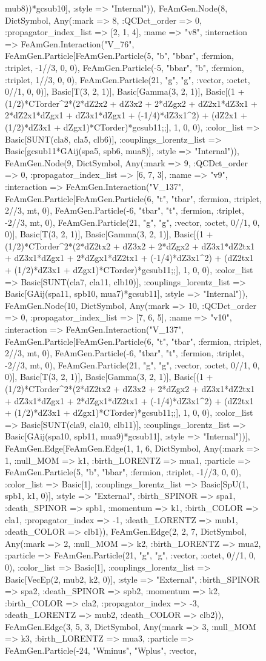\documentclass{revtex4}
\begin{document}
\begin{figure}[!htb]
\begin{center}
{mub8))*gcsub10], :style => "Internal")), FeAmGen.Node(8, Dict{Symbol, Any}(:mark => 8, :QCDct_order => 0, :propagator_index_list => [2, 1, 4], :name => "v8", :interaction => FeAmGen.Interaction("V_76", FeAmGen.Particle[FeAmGen.Particle(5, "b", "bbar", :fermion, :triplet, -1//3, 0, 0), FeAmGen.Particle(-5, "bbar", "b", :fermion, :triplet, 1//3, 0, 0), FeAmGen.Particle(21, "g", "g", :vector, :octet, 0//1, 0, 0)], Basic[T(3, 2, 1)], Basic[Gamma(3, 2, 1)], Basic[(1 + (1/2)*CTorder^2*(2*dZ2x2 + dZ3x2 + 2*dZgx2 + dZ2x1*dZ3x1 + 2*dZ2x1*dZgx1 + dZ3x1*dZgx1 + (-1/4)*dZ3x1^2) + (dZ2x1 + (1/2)*dZ3x1 + dZgx1)*CTorder)*gcsub11;;], 1, 0, 0), :color_list => Basic[SUNT(cla8, cla5, clb6)], :couplings_lorentz_list => Basic[gcsub11*GAij(spa5, spb6, mua8)], :style => "Internal")), FeAmGen.Node(9, Dict{Symbol, Any}(:mark => 9, :QCDct_order => 0, :propagator_index_list => [6, 7, 3], :name => "v9", :interaction => FeAmGen.Interaction("V_137", FeAmGen.Particle[FeAmGen.Particle(6, "t", "tbar", :fermion, :triplet, 2//3, mt, 0), FeAmGen.Particle(-6, "tbar", "t", :fermion, :triplet, -2//3, mt, 0), FeAmGen.Particle(21, "g", "g", :vector, :octet, 0//1, 0, 0)], Basic[T(3, 2, 1)], Basic[Gamma(3, 2, 1)], Basic[(1 + (1/2)*CTorder^2*(2*dZ2tx2 + dZ3x2 + 2*dZgx2 + dZ3x1*dZ2tx1 + dZ3x1*dZgx1 + 2*dZgx1*dZ2tx1 + (-1/4)*dZ3x1^2) + (dZ2tx1 + (1/2)*dZ3x1 + dZgx1)*CTorder)*gcsub11;;], 1, 0, 0), :color_list => Basic[SUNT(cla7, cla11, clb10)], :couplings_lorentz_list => Basic[GAij(spa11, spb10, mua7)*gcsub11], :style => "Internal")), FeAmGen.Node(10, Dict{Symbol, Any}(:mark => 10, :QCDct_order => 0, :propagator_index_list => [7, 6, 5], :name => "v10", :interaction => FeAmGen.Interaction("V_137", FeAmGen.Particle[FeAmGen.Particle(6, "t", "tbar", :fermion, :triplet, 2//3, mt, 0), FeAmGen.Particle(-6, "tbar", "t", :fermion, :triplet, -2//3, mt, 0), FeAmGen.Particle(21, "g", "g", :vector, :octet, 0//1, 0, 0)], Basic[T(3, 2, 1)], Basic[Gamma(3, 2, 1)], Basic[(1 + (1/2)*CTorder^2*(2*dZ2tx2 + dZ3x2 + 2*dZgx2 + dZ3x1*dZ2tx1 + dZ3x1*dZgx1 + 2*dZgx1*dZ2tx1 + (-1/4)*dZ3x1^2) + (dZ2tx1 + (1/2)*dZ3x1 + dZgx1)*CTorder)*gcsub11;;], 1, 0, 0), :color_list => Basic[SUNT(cla9, cla10, clb11)], :couplings_lorentz_list => Basic[GAij(spa10, spb11, mua9)*gcsub11], :style => "Internal"))], FeAmGen.Edge[FeAmGen.Edge(1, 1, 6, Dict{Symbol, Any}(:mark => 1, :null_MOM => k1, :birth_LORENTZ => mua1, :particle => FeAmGen.Particle(5, "b", "bbar", :fermion, :triplet, -1//3, 0, 0), :color_list => Basic[1], :couplings_lorentz_list => Basic[SpU(1, spb1, k1, 0)], :style => "External", :birth_SPINOR => spa1, :death_SPINOR => spb1, :momentum => k1, :birth_COLOR => cla1, :propagator_index => -1, :death_LORENTZ => mub1, :death_COLOR => clb1)), FeAmGen.Edge(2, 2, 7, Dict{Symbol, Any}(:mark => 2, :null_MOM => k2, :birth_LORENTZ => mua2, :particle => FeAmGen.Particle(21, "g", "g", :vector, :octet, 0//1, 0, 0), :color_list => Basic[1], :couplings_lorentz_list => Basic[VecEp(2, mub2, k2, 0)], :style => "External", :birth_SPINOR => spa2, :death_SPINOR => spb2, :momentum => k2, :birth_COLOR => cla2, :propagator_index => -3, :death_LORENTZ => mub2, :death_COLOR => clb2)), FeAmGen.Edge(3, 5, 3, Dict{Symbol, Any}(:mark => 3, :null_MOM => k3, :birth_LORENTZ => mua3, :particle => FeAmGen.Particle(-24, "Wminus", "Wplus", :vector, }
\end{center}
\end{figure}
\end{document}
